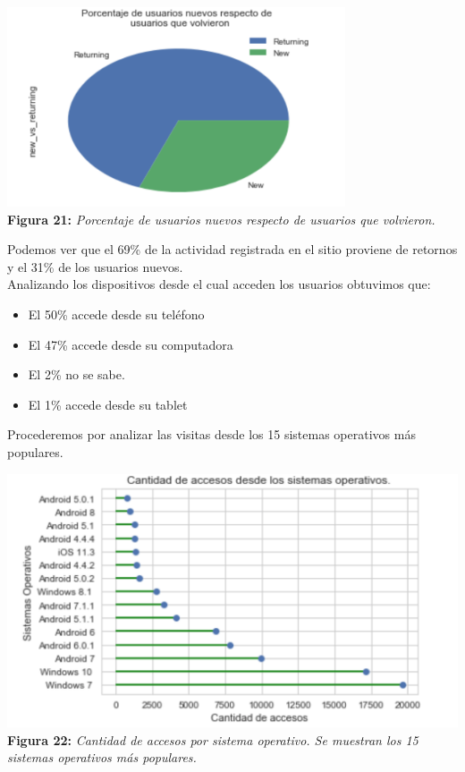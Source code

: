 \documentclass[titlepage,a4paper]{article}
\begin{document}
	\begin{center}
	\includegraphics[width=10cm] {porcentajeUsuariosNuevosRespectoDeUsQueVolvieron.jpg}\\
	\textbf{Figura 21:}  \textit{Porcentaje de usuarios nuevos respecto de usuarios que volvieron. }
	\end{center}
	Podemos ver que el 69\% de la actividad registrada en el sitio proviene de retornos  y el  31\% de los usuarios nuevos. \\
	Analizando los dispositivos desde el cual acceden los usuarios obtuvimos que:
\begin{itemize}
\item El 50\% accede desde su teléfono
\item El 47\% accede desde su computadora
\item El 2\% no se sabe. 
\item El 1\% accede desde su tablet
\end{itemize}
	Procederemos por analizar las visitas desde los 15 sistemas operativos más populares. 
	\begin{center}
	\includegraphics[width=15cm] {cantidadDeAccesosDesdeLosSistemasOperativos.jpg}\\
	\textbf{Figura 22:}  \textit{Cantidad de accesos por sistema operativo. Se muestran los 15 sistemas operativos más populares.}
	\end{center}
	
\end{document}
